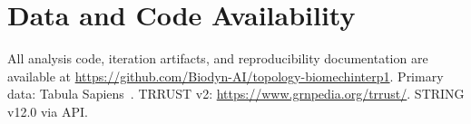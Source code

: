 \documentclass[10pt,twocolumn]{article}
\begin{document}
\section*{Data and Code Availability}
All analysis code, iteration artifacts, and reproducibility documentation are available at \url{https://github.com/Biodyn-AI/topology-biomechinterp1}.
Primary data: Tabula Sapiens~\citep{jones2022tabula}.
TRRUST v2: \url{https://www.grnpedia.org/trrust/}.
STRING v12.0 via API.


\end{document}
